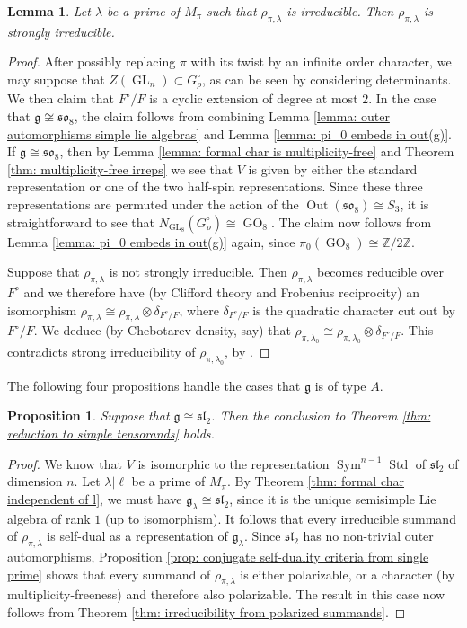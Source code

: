 \documentclass{amsart}
\newtheorem{lemma}[theorem]{Lemma}
\newtheorem{proposition}[theorem]{Proposition}
\theoremstyle{definition}
\numberwithin{equation}{section} %
\newcommand{\GL}{\operatorname{GL}}
\newcommand{\GO}{\operatorname{GO}}
\newcommand{\sllie}{\mathfrak{sl}}
\newcommand{\solie}{\mathfrak{so}}
\newcommand{\Out}{\operatorname{Out}}
\newcommand{\Sym}{\operatorname{Sym}}
\newcommand{\Std}{\operatorname{Std}}
\newcommand{\mf}[1]{\mathfrak{#1}}
\begin{document}
\begin{lemma}
Let $\lambda$ be a prime of $M_\pi$ such that $\rho_{\pi,\lambda}$ is irreducible.
Then $\rho_{\pi,\lambda}$ is strongly irreducible.
\end{lemma}
\begin{proof}
After possibly replacing $\pi$ with its twist by an infinite order character, we may suppose that $Z(\GL_n) \subset G_{\rho}^\circ$, as can be seen by considering determinants.
We then claim that $F^\circ/F$ is a cyclic extension of degree at most $2$.
In the case that $\mf{g} \not\cong \solie_8$, the claim follows from combining Lemma \ref{lemma: outer automorphisms simple lie algebras} and Lemma \ref{lemma: pi_0 embeds in out(g)}.
If $\mf{g} \cong \solie_8$, then by Lemma \ref{lemma: formal char is multiplicity-free} and Theorem \ref{thm: multiplicity-free irreps} we see that $V$ is given by either the standard representation or one of the two half-spin representations.
Since these three representations are permuted under the action of the $\Out(\solie_8) \cong S_3$, it is straightforward to see that $N_{\GL_8}(G_{\rho}^\circ) \cong \GO_8$.
The claim now follows from Lemma \ref{lemma: pi_0 embeds in out(g)} again, since $\pi_0(\GO_8) \cong \mathbb{Z}/2\mathbb{Z}$.

Suppose that $\rho_{\pi,\lambda}$ is not strongly irreducible. Then $\rho_{\pi,\lambda}$ becomes reducible over $F^\circ$ and we therefore have (by Clifford theory and Frobenius reciprocity) an isomorphism
$\rho_{\pi,\lambda} \cong \rho_{\pi,\lambda} \otimes \delta_{F^\circ/F}$, where $\delta_{F^\circ/F}$ is the quadratic character cut out by $F^\circ/F$.
We deduce (by Chebotarev density, say) that $\rho_{\pi,\lambda_0} \cong \rho_{\pi,\lambda_0} \otimes \delta_{F^\circ/F}$.
This contradicts strong irreducibility of $\rho_{\pi,\lambda_0}$, by \cite[Lemma 4.8 (1)]{kret2022galois}.
\end{proof}

The following four propositions handle the cases that $\mf{g}$ is of type $A$.

\begin{proposition} \label{prop: sl_2 irred}
Suppose that $\mf{g} \cong \sllie_{2}$.
Then the conclusion to Theorem \ref{thm: reduction to simple tensorands} holds.
\end{proposition}
\begin{proof}
We know that $V$ is isomorphic to the representation $\Sym^{n-1} \Std$ of $\sllie_2$ of dimension $n$.
Let $\lambda | \ell$ be a prime of $M_\pi$.
By Theorem \ref{thm: formal char independent of l}, we must have $\mf{g}_\lambda \cong \sllie_2$, since it is the unique semisimple Lie algebra of rank $1$ (up to isomorphism).
It follows that every irreducible summand of $\rho_{\pi,\lambda}$ is self-dual as a representation of $\mf{g}_\lambda$.
Since $\sllie_2$ has no non-trivial outer automorphisms, Proposition \ref{prop: conjugate self-duality criteria from single prime} shows that every summand of $\rho_{\pi,\lambda}$ is either polarizable, or a character (by multiplicity-freeness) and therefore also polarizable.
The result in this case now follows from Theorem \ref{thm: irreducibility from polarized summands}.    
\end{proof}
\end{document}
